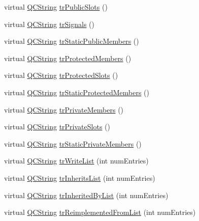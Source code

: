 \begin{DoxyCompactItemize}
\item 
virtual \hyperlink{class_q_c_string}{Q\+C\+String} \hyperlink{class_translator_czech_ab4acb85d43ab2faf0728c8887dd022dd}{tr\+Public\+Slots} ()
\item 
virtual \hyperlink{class_q_c_string}{Q\+C\+String} \hyperlink{class_translator_czech_a5612955877d14d9b8085b510195795d1}{tr\+Signals} ()
\item 
virtual \hyperlink{class_q_c_string}{Q\+C\+String} \hyperlink{class_translator_czech_ae7730596b9725cf0e8830a40802cc661}{tr\+Static\+Public\+Members} ()
\item 
virtual \hyperlink{class_q_c_string}{Q\+C\+String} \hyperlink{class_translator_czech_a62582bd3a5eb8bfb9e73f269abaf7078}{tr\+Protected\+Members} ()
\item 
virtual \hyperlink{class_q_c_string}{Q\+C\+String} \hyperlink{class_translator_czech_a4bc2431fd20838b2174effc66b7f98b2}{tr\+Protected\+Slots} ()
\item 
virtual \hyperlink{class_q_c_string}{Q\+C\+String} \hyperlink{class_translator_czech_a235cf582ebf1fe4b08bb2ae2c98863ab}{tr\+Static\+Protected\+Members} ()
\item 
virtual \hyperlink{class_q_c_string}{Q\+C\+String} \hyperlink{class_translator_czech_a94f7da779b089c7c5471020e37b9a46c}{tr\+Private\+Members} ()
\item 
virtual \hyperlink{class_q_c_string}{Q\+C\+String} \hyperlink{class_translator_czech_a88412a1a5a8096a418f47a6e39187c2a}{tr\+Private\+Slots} ()
\item 
virtual \hyperlink{class_q_c_string}{Q\+C\+String} \hyperlink{class_translator_czech_a30a13f15d8e3551b3373c753055ec5cc}{tr\+Static\+Private\+Members} ()
\item 
virtual \hyperlink{class_q_c_string}{Q\+C\+String} \hyperlink{class_translator_czech_a76990cacd056f67d91d4fe784c7bcfca}{tr\+Write\+List} (int num\+Entries)
\item 
virtual \hyperlink{class_q_c_string}{Q\+C\+String} \hyperlink{class_translator_czech_a89ba82a9a80bb51ff8ec66d3e7be7460}{tr\+Inherits\+List} (int num\+Entries)
\item 
virtual \hyperlink{class_q_c_string}{Q\+C\+String} \hyperlink{class_translator_czech_a05ea646c77aa8db1faac4dfeaf9fd7cd}{tr\+Inherited\+By\+List} (int num\+Entries)
\item 
virtual \hyperlink{class_q_c_string}{Q\+C\+String} \hyperlink{class_translator_czech_a846c95344a7bb1411aa7c71248c5a4bb}{tr\+Reimplemented\+From\+List} (int num\+Entries)
\item 

\end{DoxyCompactItemize}
